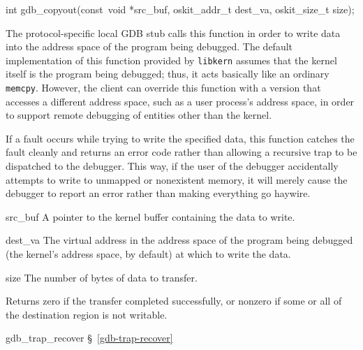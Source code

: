 \label{gdb-copyout}
\begin{apisyn}

	\funcproto int gdb_copyout(const~void *src_buf, oskit_addr_t dest_va,
				   oskit_size_t size);
\end{apisyn}
\begin{apidesc}
	The protocol-specific local GDB stub
	calls this function in order to write data
	into the address space of the program being debugged.
	The default implementation of this function provided by {\tt libkern}
	assumes that the kernel itself is the program being debugged;
	thus, it acts basically like an ordinary {\tt memcpy}.
	However, the client can override this function
	with a version that accesses a different address space,
	such as a user process's address space,
	in order to support remote debugging of entities other than the kernel.

	If a fault occurs while trying to write the specified data,
	this function catches the fault cleanly and returns an error code
	rather than allowing a recursive trap to be dispatched to the debugger.
	This way, if the user of the debugger
	accidentally attempts to write to unmapped or nonexistent memory,
	it will merely cause the debugger to report an error
	rather than making everything go haywire.
\end{apidesc}
\begin{apiparm}
	\item[src_buf]
		A pointer to the kernel buffer
		containing the data to write.
	\item[dest_va]
		The virtual address
		in the address space of the program being debugged
		(the kernel's address space, by default)
		at which to write the data.
	\item[size]
		The number of bytes of data to transfer.
\end{apiparm}
\begin{apiret}
	Returns zero if the transfer completed successfully,
	or nonzero if some or all of the destination region is not writable.
\end{apiret}
\begin{apidep}
	\item[gdb_trap_recover]		\S~\ref{gdb-trap-recover}
\end{apidep}

\label{gdb-trap-recover}

